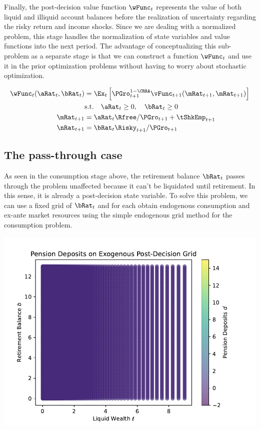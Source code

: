 \documentclass[\econtexRoot/SequentialEGM]{subfiles}
\begin{document}
Finally, the post-decision value function $\wFunc_{t}$ represents the value of both liquid and illiquid account balances before the realization of uncertainty regarding the risky return and income shocks. Since we are dealing with a normalized problem, this stage handles the normalization of state variables and value functions into the next period. The advantage of conceptualizing this sub-problem as a separate stage is that we can construct a function $\wFunc_{t}$ and use it in the prior optimization problems without having to worry about stochastic optimization.

\begin{equation}
        \begin{split}
                \wFunc_{t}(\aRat_{t}, \bRat_{t}) & = \Ex_{t} \left[ \PGro_{t+1}^{1-\CRRA} \vFunc_{t+1}(\mRat_{t+1}, \mRat_{t+1}) \right] \\
                & \text{s.t.} \quad \aRat_{t} \ge 0, \quad \bRat_{t} \ge 0 \\
                \mRat_{t+1} & = \aRat_{t} \Rfree / \PGro_{t+1}  + \tShkEmp_{t+1} \\
                \nRat_{t+1} & = \bRat_{t} \Risky_{t+1} /  \PGro_{t+1}
        \end{split}
\end{equation}

\subsection{The pass-through case}

As seen in the consumption stage above, the retirement balance $\bRat_{t}$ passes through the problem unaffected because it can't be liquidated until retirement. In this sense, it is already a post-decision state variable. To solve this problem, we can use a fixed grid of $\bRat_{t}$ and for each obtain endogenous consumption and ex-ante market resources using the simple endogenous grid method for the consumption problem.


\includegraphics[width=\textwidth]{Figures/ExogenousGrid.pdf}
\end{document}
